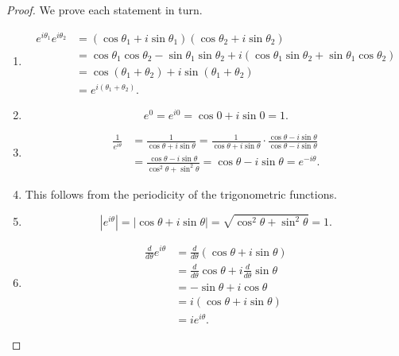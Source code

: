 \begin{proof}
    We prove each statement in turn.
    \begin{enumerate}[label=(\alph*)]
        \item \[
            \begin{aligned}
                e^{i\theta_1}e^{i\theta_2} &= (\cos\theta_1 + i\sin\theta_1)(\cos\theta_2 + i\sin\theta_2) \\
                &= \cos\theta_1\cos\theta_2 - \sin\theta_1\sin\theta_2 + i(\cos\theta_1\sin\theta_2 + \sin\theta_1\cos\theta_2) \\
                &= \cos(\theta_1 + \theta_2) + i\sin(\theta_1 + \theta_2) \\
                &= e^{i(\theta_1 + \theta_2)}.
            \end{aligned}
        \]
        \item \[
            e^0 = e^{i0} = \cos 0 + i\sin 0 = 1.
        \]
        \item \[
            \begin{aligned}
                \frac{1}{e^{i\theta}} &= \frac{1}{\cos\theta + i\sin\theta} = \frac{1}{\cos\theta + i\sin\theta} \cdot \frac{\cos\theta - i\sin\theta}{\cos\theta - i\sin\theta} \\
                &= \frac{\cos\theta - i\sin\theta}{\cos^2\theta + \sin^2\theta} = \cos\theta - i\sin\theta = e^{-i\theta}.
            \end{aligned}
        \]
        \item This follows from the periodicity of the trigonometric functions.
        \item \[
            |e^{i\theta}| = |\cos\theta + i\sin\theta| = \sqrt{\cos^2\theta + \sin^2\theta} = 1.
        \]
        \item \[
            \begin{aligned}
                \frac{d}{d\theta}e^{i\theta} &= \frac{d}{d\theta}(\cos\theta + i\sin\theta) \\
                &= \frac{d}{d\theta}\cos\theta + i\frac{d}{d\theta}\sin\theta \\
                &= -\sin\theta + i\cos\theta \\
                &= i(\cos\theta + i\sin\theta) \\
                &= ie^{i\theta}.
            \end{aligned}
        \]
    \end{enumerate}
\end{proof}

